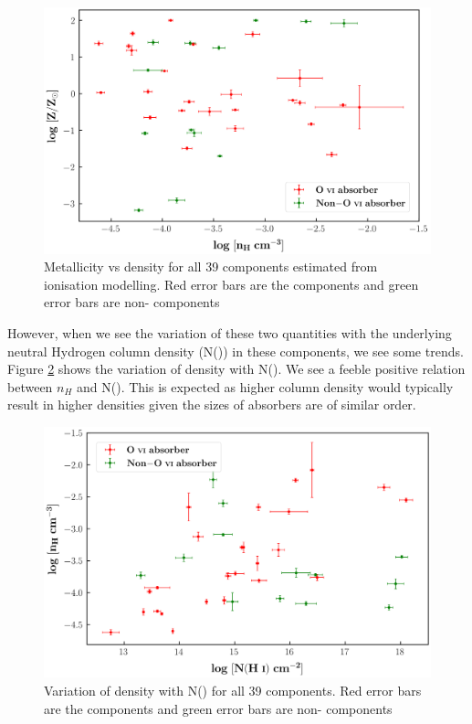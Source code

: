 \begin{figure}
    \centering
    \includegraphics[width=\linewidth,draft=False]{Figures/Z_vs_nH.png}
    \caption{Metallicity vs density for all 39 components estimated from ionisation modelling. Red error bars are the  components and green error bars are non- components}
    \label{fig:nH-Z}
\end{figure}

However, when we see the variation of these two quantities with the underlying neutral Hydrogen column density (N()) in these components, we see some trends. Figure \ref{fig:nH-NHi} shows the variation of density with N(). We see a feeble positive relation between $n_H$ and N(). This is expected as higher column density would typically result in higher densities given the sizes of absorbers are of similar order. 

\begin{figure}
    \centering
    \includegraphics[width=\linewidth,draft=False]{Figures/nH_vs_NHi.png}
    \caption{Variation of density with N() for all 39 components. Red error bars are the  components and green error bars are non- components}
    \label{fig:nH-NHi}
\end{figure}

